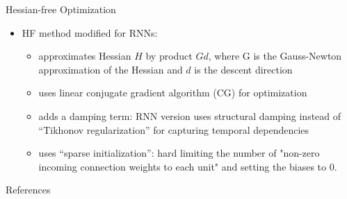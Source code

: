 \documentclass[12pt]{beamer}
\begin{document}
\begin{frame}{Hessian-free Optimization}
    \begin{alertblock}{}
        \begin{itemize}
            \item HF method modified for RNNs:
            \begin{itemize}
                \item approximates Hessian $H$ by product $Gd$, where G is the Gauss-Newton approximation of the Hessian and $d$ is the descent direction
                \item uses linear conjugate gradient algorithm (CG) for optimization
                \item adds a damping term: RNN version uses structural damping \cite{Martens2011HFRNN} instead of ``Tikhonov regularization'' \cite{martens2010HFDNN} for capturing temporal dependencies
                \item uses ``sparse initialization'': hard limiting the number of "non-zero incoming connection weights to each unit" and setting the biases to 0.
            \end{itemize}
        \end{itemize}
    \end{alertblock}
\end{frame}

\begin{frame}[allowframebreaks]{References}
    
    
\end{frame}
\end{document}
